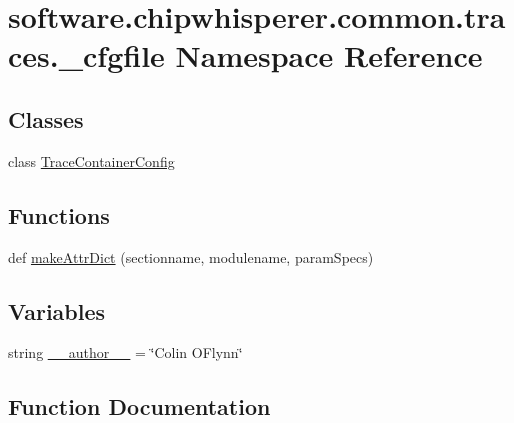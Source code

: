 \hypertarget{namespacesoftware_1_1chipwhisperer_1_1common_1_1traces_1_1__cfgfile}{}\section{software.\+chipwhisperer.\+common.\+traces.\+\_\+cfgfile Namespace Reference}
\label{namespacesoftware_1_1chipwhisperer_1_1common_1_1traces_1_1__cfgfile}
\subsection*{Classes}
\begin{DoxyCompactItemize}
\item 
class \hyperlink{classsoftware_1_1chipwhisperer_1_1common_1_1traces_1_1__cfgfile_1_1TraceContainerConfig}{Trace\+Container\+Config}
\end{DoxyCompactItemize}
\subsection*{Functions}
\begin{DoxyCompactItemize}
\item 
def \hyperlink{namespacesoftware_1_1chipwhisperer_1_1common_1_1traces_1_1__cfgfile_ae5242f90d9cfb290f14d59027088de1e}{make\+Attr\+Dict} (sectionname, modulename, param\+Specs)
\end{DoxyCompactItemize}
\subsection*{Variables}
\begin{DoxyCompactItemize}
\item 
string \hyperlink{namespacesoftware_1_1chipwhisperer_1_1common_1_1traces_1_1__cfgfile_ace8a3b8ccc370e5d6fc081e07eb5ea19}{\+\_\+\+\_\+author\+\_\+\+\_\+} = \char`\"{}Colin O\textquotesingle{}Flynn\char`\"{}
\end{DoxyCompactItemize}


\subsection{Function Documentation}
\hypertarget{namespacesoftware_1_1chipwhisperer_1_1common_1_1traces_1_1__cfgfile_ae5242f90d9cfb290f14d59027088de1e}{}
